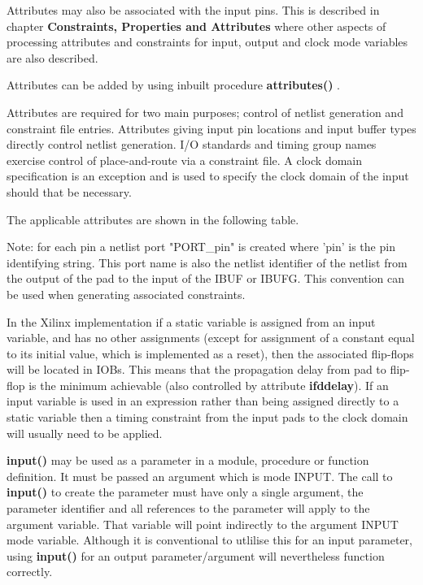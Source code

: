         Attributes may also be associated with the input pins. This is described
        in chapter  {\bf Constraints, Properties and
        Attributes} where other aspects of processing attributes and constraints
        for input, output and clock mode variables are also described.

        Attributes can be added by using inbuilt procedure {\bf attributes()}
        .             
        
        Attributes are required for two main purposes; control of netlist
        generation and constraint file entries. Attributes giving input pin
        locations and input buffer types directly control netlist generation.
        I/O standards and timing group names exercise control of place-and-route
        via a constraint file. A clock domain specification is an exception and
        is used to specify the clock domain of the input should that be necessary.
        
        The applicable attributes are shown in the following table.

        
        
        Note: for each pin a netlist port "PORT\_pin" is created where 'pin' is
        the pin identifying string. This port name is also the netlist identifier
        of the netlist from the output of the pad to the input of the IBUF or
        IBUFG. This convention can be used when generating associated constraints.
        
        In the Xilinx implementation if a static variable is assigned from an input
        variable, and has no other assignments (except for assignment of a constant
        equal to its initial value, which is implemented as a reset), then the
        associated flip-flops will be located in IOBs. This means that the
        propagation delay from pad to flip-flop is the minimum achievable (also
        controlled by attribute {\bf ifddelay}). If an input variable is used in an
        expression rather than being assigned directly to a static variable then a
        timing constraint from the input pads to the clock domain will usually need
        to be applied.
        
        {\bf input()} may be used as a parameter in a module, procedure or
        function definition. It must be passed an argument which is mode INPUT.
        The call to {\bf input()} to create the parameter must have only a
        single argument, the parameter identifier and all references to the
        parameter will apply to the argument variable. That variable will point
        indirectly to the argument INPUT mode variable. Although it is
        conventional to utlilise this for an input parameter, using {\bf input()}
        for an output parameter/argument will nevertheless function correctly.
        

